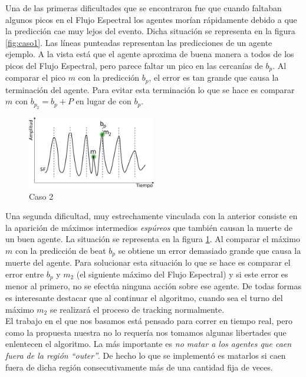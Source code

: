 \documentclass[12pt,a4paper,titlepage]{report}
\begin{document}
Una de las primeras dificultades que se encontraron fue que cuando faltaban algunos picos en el Flujo Espectral los agentes morían rápidamente debido a que la predicción cae muy lejos del evento. Dicha situación se representa en la figura \ref{fig:caso1}. Las líneas punteadas representan las predicciones de un agente ejemplo. A la vista está que el agente aproxima de buena manera a todos de los picos del Flujo Espectral, pero parece faltar un pico en las cercanías de $b_p$. Al comparar el pico $m$ con la predicción $b_p$, el error es tan grande que causa la terminación del agente. Para evitar esta terminación lo que se hace es comparar $m$ con $b_{p_2}=b_p+P$ en lugar de con $b_p$.

\begin{figure}
	\vspace{-25pt}
	\begin{center}
	\includegraphics[width=0.5\textwidth]{./pics/caso2.png}
	\end{center}
	\vspace{-20pt}
	\caption{Caso 2}
	\label{fig:caso2}
\end{figure}

Una segunda dificultad, muy estrechamente vinculada con la anterior consiste en la aparición de máximos intermedios \emph{espúreos} que también causan la muerte de un buen agente. La situación se representa en la figura \ref{fig:caso2}. Al comparar el máximo $m$ con la predicción de beat $b_p$ se obtiene un error demasiado grande que causa la muerte del agente. Para solucionar esta situación lo que se hace es comparar el error entre $b_p$ y $m_2$ (el siguiente máximo del Flujo Espectral) y si este error es menor al primero, no se efectúa ninguna acción sobre ese agente. De todas formas es interesante destacar que al continuar el algoritmo, cuando sea el turno del máximo $m_2$ se realizará el proceso de tracking normalmente.\\

El trabajo en el que nos basamos está pensado para correr en tiempo real, pero como la propuesta nuestra no lo requería nos tomamos algunas libertades que enlentecen el algoritmo. La más importante es \emph{no matar a los agentes que caen fuera de la región ``outer''}. De hecho lo que se implementó es matarlos si caen fuera de dicha región consecutivamente más de una cantidad fija de veces.\\
\end{document}

